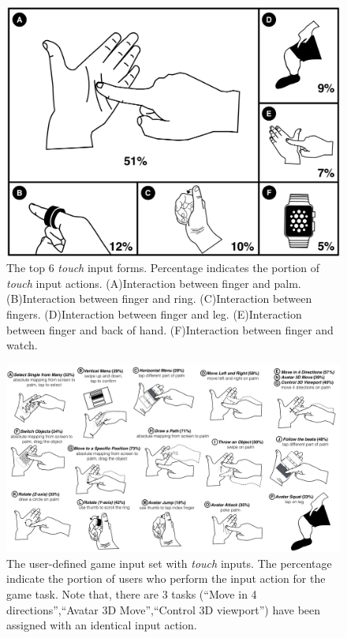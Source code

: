 \documentclass{sigchi}
\begin{document}
   \begin{figure}[!h]
    \centering
    \includegraphics[width=1\columnwidth]{OnBodyForms.pdf}
    \caption{The top 6 \emph{touch} input forms. Percentage indicates the portion of \emph{touch} input actions. (A)Interaction between finger and palm. (B)Interaction between finger and ring. (C)Interaction between fingers. (D)Interaction between finger and leg. (E)Interaction between finger and back of hand. (F)Interaction between finger and watch.}
    \label{fig:figureOnBodyPorpotion}
    \end{figure}   


  \begin{figure}
  \centering
  \includegraphics[width=1\textwidth]{OnBodyInputSet.pdf}
  \caption{The user-defined game input set with \emph{touch} inputs. The percentage indicate the portion of users who perform the input action for the game task. Note that, there are 3 tasks (``Move in 4 directions'',``Avatar 3D Move'',``Control 3D viewport'') have been assigned with an identical input action.}
  \label{fig:OnBodyInputSet}
  \end{figure}
\end{document}
